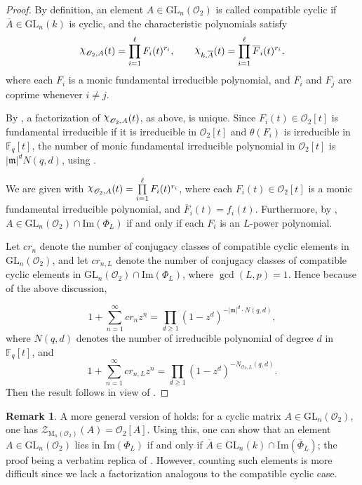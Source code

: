 \documentclass[11pt,twoside]{amsart}
\newcommand{\GL}{\mathrm{GL}}
\newcommand{\M}{\mathrm{M}}
\newcommand{\im}{\mathrm{Im}}
\newcommand{\upchi}{\raisebox{0.4ex}{$\chi$}}
\newcommand{\Char}{\upchi}
\newcommand{\R}{\mathscr{O}_2}
\newcommand{\Fq}{\mathbb{F}_q}
\newcommand{\Zen}{\mathscr{Z}}
\theoremstyle{definition} %
\newtheorem{remark}[lemma]{Remark}
\begin{document}
\begin{proof}
By definition, an element $A\in\GL_n(\R)$ is called compatible cyclic if $\overline{A}\in\GL_n(k)$ is cyclic, and the characteristic polynomials satisfy  
\[
\Char_{\R,A}(t)=\prod_{i=1}^{\ell}F_i(t)^{r_i}, 
\qquad 
\Char_{k,\overline{A}}(t)=\prod_{i=1}^{\ell}\overline{F}_i(t)^{r_i},
\]
where each $F_i$ is a monic fundamental irreducible polynomial, and $F_i$ and $F_j$ are coprime whenever $i\neq j$.

By , a factorization of $\Char_{\R,A}(t)$, as above, is unique. 
Since $F_i(t)\in\R[t]$ is fundamental irreducible if it is irreducible in $\R[t]$ and $\theta(F_i)$ is irreducible in $\Fq[t]$, the number of monic fundamental irreducible polynomial in $\R[t]$ is $|\mathfrak{m}|^dN(q,d)$, using .

We are given with $\Char_{\R,A}(t)=\prod\limits_{i=1}^{\ell}F_i(t)^{r_i}$, where each $F_i(t)\in\R[t]$ is a monic fundamental irreducible polynomial, and $\overline{F}_i(t)=f_i(t)$. 
Furthermore, by , $A\in\GL_n(\R)\cap\im(\Phi_L)$ if and only if each $F_i$ is an $L$-power polynomial. 

Let $cr_n$ denote the number of conjugacy classes of compatible cyclic elements in $\GL_n(\R)$, and let $cr_{n,L}$ denote the number of conjugacy classes of compatible cyclic elements in $\GL_n(\R) \cap \im(\Phi_L)$, where $\gcd(L,p)=1$.  Hence because of the above discussion,

    \begin{equation*}\label{eq:conj-comp-cyc}
    1+\sum\limits_{n=1}^{\infty}cr_nz^n=\prod\limits_{d\geq 1} (1-z^d)^{-|\mathfrak{m}|^d\cdot N(q,d)},
    \end{equation*}
    where $N(q,d)$ denotes the number of irreducible polynomial of degree $d$ in $\Fq[t]$, and
    \begin{equation*}\label{eq:conj-comp-cyc-L}
   1+\sum\limits_{n=1}^{\infty}cr_{n,L}z^n=\prod\limits_{d\geq 1}(1-z^d)^{-N_{\R,L}(q,d)}.
   \end{equation*}
Then the result follows in view of .
\end{proof}
\begin{remark}
A more general version of  holds: for a cyclic matrix $A\in\GL_n(\R)$, one has $\Zen_{\M_n(\R)}(A)=\R[A]$.  
Using this, one can show that an element $A\in\GL_n(\R)$ lies in $\im(\Phi_L)$ if and only if $\overline{A}\in\GL_n(k)\cap\im(\overline{\Phi}_L)$; the proof being a verbatim replica of .  
However, counting such elements is more difficult since we lack a factorization analogous to the compatible cyclic case.
\end{remark}
\end{document}

